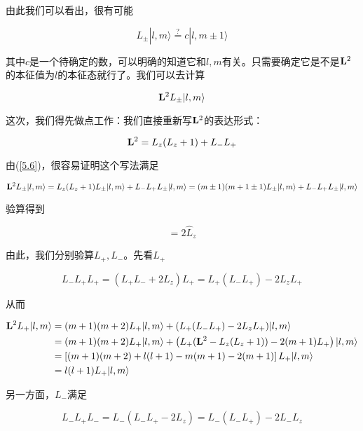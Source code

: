 由此我们可以看出，很有可能

\begin{equation}
L_{\pm}|l,m\rangle \overset{?}{=} c|l,m\pm1\rangle
\end{equation}

其中$c$是一个待确定的数，可以明确的知道它和$l,m$有关。只需要确定它是不是${\bf L}^2$的本征值为$l$的本征态就行了。我们可以去计算

\begin{equation}
{\bf L}^2L_{\pm}|l,m\rangle
\end{equation}

这次，我们得先做点工作：我们直接重新写${\bf L}^2$的表达形式：

\begin{equation}
{\bf L}^2 = L_z(L_z+1)+L_-L_+
\end{equation}

由(\ref{5.6})，很容易证明这个写法满足

\begin{equation}
{\bf L}^2L_{\pm}|l,m\rangle =  L_z(L_z+1)L_{\pm}|l,m\rangle + L_-L_+L_{\pm}|l,m\rangle = (m\pm1)(m+1\pm1)L_{\pm}|l,m\rangle + L_-L_+L_{\pm}|l,m\rangle
\end{equation}

验算得到

\begin{equation}
[\hat L_+,\hat L_-] = 2\hat L_z
\end{equation}

由此，我们分别验算$L_+,L_-$。先看$L_+$

\begin{equation}
L_-L_+L_+ = (L_+L_- + 2L_z) L_+ = L_+ (L_-L_+) - 2L_zL_+
\end{equation}

从而

\begin{equation}
\begin{split}
{\bf L}^2L_{+}|l,m\rangle &= (m+1)(m+2)L_{+}|l,m\rangle +(L_+ (L_-L_+) - 2L_zL_+)|l,m\rangle \\
&= (m+1)(m+2)L_{+}|l,m\rangle +\left(L_+ ({\bf L}^2 - L_z(L_z+1)) -2(m+1)L_+\right)|l,m\rangle \\
&= \left[(m+1)(m+2) + l(l+1) - m(m+1) - 2(m+1)\right]L_+|l,m\rangle \\
&= l(l+1)L_+|l,m\rangle
\end{split}
\end{equation}

另一方面，$L_-$满足

\begin{equation}
L_-L_+L_- = L_-(L_-L_+ -2L_z) = L_-(L_-L_+) - 2L_-L_z
\end{equation}

